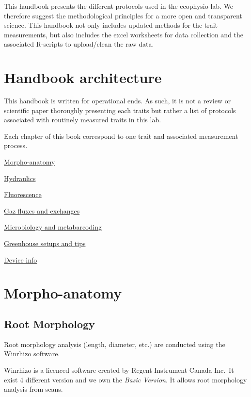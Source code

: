 \documentclass[
  12pt,
  american,
  a4paper,
  extrafontsizes,onecolumn,openright
  ]{memoir}
\begin{document}
This handbook presents the different protocols used in the ecophysio lab. We therefore suggest the methodological principles for a more open and transparent science. This handbook not only includes updated methods for the trait measurements, but also includes the excel worksheets for data collection and the associated R-scripts to upload/clean the raw data.

\hypertarget{handbook-architecture}{%
\chapter{Handbook architecture}\label{handbook-architecture}}

This handbook is written for operational ends. As such, it is not a review or scientific paper thoroughly presenting each traits but rather a list of protocols associated with routinely measured traits in this lab.

Each chapter of this book correspond to one trait and associated measurement process.

\protect\hyperlink{morpho-anatomy}{Morpho-anatomy}

\protect\hyperlink{hydraulics}{Hydraulics}

\protect\hyperlink{fluorescence}{Fluorescence}

\protect\hyperlink{gaz-fluxes-and-exchanges}{Gaz fluxes and exchanges}

\protect\hyperlink{microbiology-and-metabarcoding}{Microbiology and metabarcoding}

\protect\hyperlink{greenhouse-setups-and-tips}{Greenhouse setups and tips}

\protect\hyperlink{device-info}{Device info}

\hypertarget{morpho-anatomy}{%
\chapter{Morpho-anatomy}\label{morpho-anatomy}}

\hypertarget{root-morphology}{%
\section{Root Morphology}\label{root-morphology}}

Root morphology analysis (length, diameter, etc.) are conducted using the Winrhizo software.

Winrhizo is a licenced software created by Regent Instrument Canada Inc.~It exist 4 different version and we own the \emph{Basic Version}. It allows root morphology analysis from scans.
\end{document}
